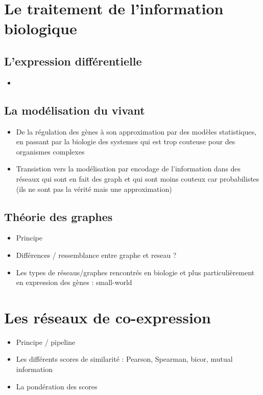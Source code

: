 \section{Le traitement de l'information biologique}
\subsection{L'expression différentielle}
\begin{itemize}
  \item
\end{itemize}

\subsection{La modélisation du vivant}
\begin{itemize}
\item De la régulation des gènes à son approximation par des modèles statistiques, en passant par la biologie des systemes qui est trop couteuse pour des organismes complexes %
\item Transistion vers la modélisation par encodage de l'information dans des réseaux qui sont en fait des graph et qui sont moins couteux car probabilistes (ils ne sont pas la vérité mais une approximation)
\end{itemize}

\subsection{Théorie des graphes}
\begin{itemize}
\item Principe 
\item Différences / ressemblance entre graphe et reseau ?
\item Les types de réseaus/graphes rencontrés en biologie et plus particulièrement en expression des gènes : small-world
\end{itemize}

\section{Les réseaux de  co-expression}
\begin{itemize}
\item Principe / pipeline 
\item Les différents scores de similarité : Pearson, Spearman, bicor, mutual information
\item La pondération des scores 
\end{itemize}


